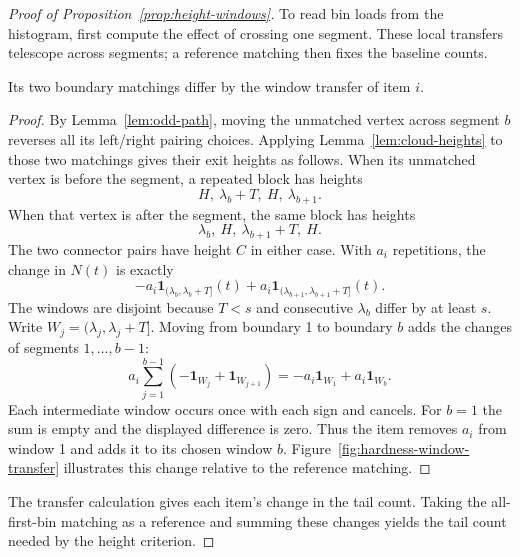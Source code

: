 \begin{proof}[Proof of Proposition~\ref{prop:height-windows}]
To read bin loads from the histogram, first compute the effect
of crossing one segment. These local transfers telescope across
segments; a reference matching then fixes the baseline counts.

\begin{claim}
\label{clm:height-segment-transfer}
Its two boundary matchings differ by the window transfer of item $i$.
\end{claim}
\begin{proof}
By Lemma~\ref{lem:odd-path}, moving the unmatched vertex across
segment $b$ reverses all its left/right pairing choices. Applying
Lemma~\ref{lem:cloud-heights} to those two matchings gives their
exit heights as follows.
When its unmatched vertex is before the segment, a repeated block
has heights
\[
 H,\ \lambda_b+T,\ H,\ \lambda_{b+1}.
\]
When that vertex is after the segment, the same block has heights
\[
 \lambda_b,\ H,\ \lambda_{b+1}+T,\ H.
\]
The two connector pairs have height $C$ in either case.
With $a_i$ repetitions, the change in $N(t)$ is exactly
\[
 -a_i\mathbf1_{(\lambda_b,\lambda_b+T]}(t)+
  a_i\mathbf1_{(\lambda_{b+1},\lambda_{b+1}+T]}(t).
\]
The windows are disjoint because $T<s$ and consecutive
$\lambda_b$ differ by at least $s$. Write
$W_j=(\lambda_j,\lambda_j+T]$. Moving from boundary 1 to
boundary $b$ adds the changes of segments $1,\ldots,b-1$:
\[
 a_i\sum_{j=1}^{b-1}
       (-\mathbf1_{W_j}+\mathbf1_{W_{j+1}})
 =-a_i\mathbf1_{W_1}+a_i\mathbf1_{W_b}.
\]
Each intermediate window occurs once with each sign and cancels.
For $b=1$ the sum is empty and the displayed difference is zero.
Thus the item removes $a_i$ from window 1 and adds it to its chosen
window $b$. Figure~\ref{fig:hardness-window-transfer}
illustrates this change relative to the reference matching.
\end{proof}
The transfer calculation gives each item's change in the tail count.
Taking the all-first-bin matching as a reference and summing these
changes yields the tail count needed by the height criterion.


\end{proof}
